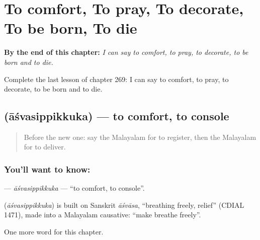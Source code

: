 
\chapter{To comfort, To pray, To decorate, To be born, To die}
\label{ch:ml-to-comfort-to-pray-to-decorate-to-be-born-to-die}

\begin{chapteropening}
\textbf{By the end of this chapter:} \emph{I can say to comfort, to pray, to decorate, to be born and to die.}

Complete the last lesson of chapter 269: I can say to comfort, to pray, to decorate, to be born and to die.
\end{chapteropening}

\section[\texorpdfstring{\ml{ആശ്വസിപ്പിക്കുക} (āśvasippikkuka)}{ആശ്വസിപ്പിക്കുക (āśvasippikkuka)}]{ (āśvasippikkuka) — to comfort, to console}

\label{lesson:ML-C269-asvasippikkuka}



\begin{quote}
Before the new one: say the Malayalam for to register, then the Malayalam for to deliver.
\end{quote}

\subsection*{You'll want to know: }
\textbf{} — \emph{āśvasippikkuka} — \textquotedblleft{}to comfort, to console\textquotedblright{}.

\begin{cousinweb}
\textbf{} (\emph{āśvasippikkuka}) is built on Sanskrit \emph{āśvāsa}, \textquotedblleft{}breathing freely, relief\textquotedblright{} (CDIAL 1471), made into a Malayalam causative: \textquotedblleft{}make breathe freely\textquotedblright{}.
\end{cousinweb}

\begin{grammarlens}[title={What you've built}]
One more word for this chapter.
\end{grammarlens}

